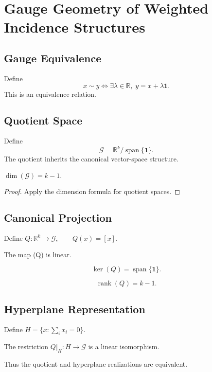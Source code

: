 \chapter[Gauge Geometry of WIS]{Gauge Geometry of Weighted Incidence Structures}
\section{Gauge Equivalence}
Define
\[ x\sim y \iff
\exists\lambda\in\mathbb R,\;
y=x+\lambda\mathbf1. \]
This is an equivalence relation.
\section{Quotient Space}
Define
\[ \mathcal G=
\mathbb R^{k}/\operatorname{span}\{\mathbf1\}. \]
The quotient inherits the canonical vector-space structure.
\begin{proposition}
\label{ch:prop:2-1}
$\dim(\mathcal G)=k-1.$
\end{proposition}
\begin{proof} Apply the dimension formula for quotient spaces. 
\end{proof}
\section{Canonical Projection}
Define
$Q:\mathbb R^{k}\to\mathcal G,\qquad Q(x)=[x].$
\begin{proposition}
\label{ch:prop:2-2}
The map (Q) is linear.
\end{proposition}
\begin{proposition}
\label{ch:prop:2-3}
\[ \ker(Q)=\operatorname{span}\{\mathbf1\}. \]
\end{proposition}
\begin{corollary}
\label{ch:cor:2-4}
\[ \operatorname{rank}(Q)=k-1. \]
\end{corollary}
\section{Hyperplane Representation}
Define
$H=\{x:\sum_i x_i=0\}.$
\begin{proposition}
\label{ch:prop:2-5}
The restriction
$Q|_H:H\to\mathcal G$
is a linear isomorphism.
\end{proposition}
Thus the quotient and hyperplane realizations are equivalent.

